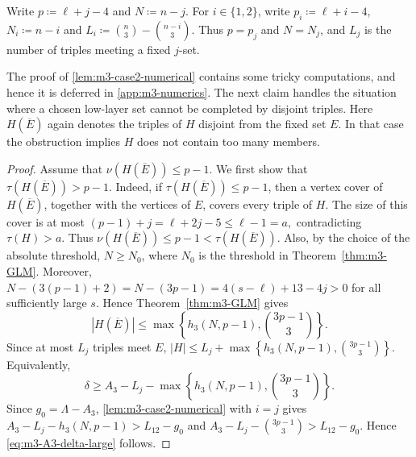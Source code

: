 \documentclass[10pt,a4paper]{article}
\numberwithin{equation}{section}
\newtheorem{lemma}[lemma]{Lemma}
\theoremstyle{definition}
\newtheorem{claim}[claim]{Claim}
\begin{document}
Write $p\coloneqq \ell+j-4$ and $N\coloneqq n-j$.
For \(i\in\{1,2\}\), write $p_i\coloneqq \ell+i-4$, $N_i\coloneqq n-i$ and $L_i\coloneqq \binom n3-\binom{n-i}{3}$.
Thus \(p=p_j\) and \(N=N_j\), and \(L_j\) is the number of triples meeting a fixed \(j\)-set.


The proof of \cref{lem:m3-case2-numerical} contains some tricky computations, and hence it is deferred in \cref{app:m3-numerics}.
The next claim handles the situation where a chosen low-layer set cannot be
completed by disjoint triples.  Here \(H(\overline E)\) again denotes the triples of \(H\) disjoint from the fixed set \(E\).
In that case the obstruction implies $H$ does not contain too many members.


\begin{proof}
    Assume that \(\nu(H(\overline E))\le p-1\).  We first show that
    \(\tau(H(\overline E))>p-1\).  Indeed, if
    \(\tau(H(\overline E))\le p-1\), then a vertex cover of
    \(H(\overline E)\), together with the vertices of \(E\), covers every
    triple of \(H\).  The size of this cover is at most
    \((p-1)+j = \ell+2j-5 \le \ell-1 = a,\)
    contradicting \(\tau(H)>a\).  Thus
    \(\nu(H(\overline E))\le p-1<\tau(H(\overline E)).\)
    Also, by the choice of the absolute threshold, \(N\ge N_0\), where
    \(N_0\) is the threshold in Theorem~\ref{thm:m3-GLM}.  Moreover,
    \(N-(3(p-1)+2) = N-(3p-1) = 4(s-\ell)+13-4j>0\)
    for all sufficiently large \(s\).  Hence Theorem~\ref{thm:m3-GLM} gives
    \[
        |H(\overline E)|
        \le
        \max\left\{
        h_3(N,p-1),\binom{3p-1}{3}
        \right\}.
    \]
    Since at most \(L_j\) triples meet \(E\), $|H|\le L_j+\max\left\{h_3(N,p-1),\binom{3p-1}{3}\right\}$.
    Equivalently,
    \[
        \delta
        \ge
        A_3-L_j-
        \max\left\{
        h_3(N,p-1),\binom{3p-1}{3}
        \right\}.
    \]
    Since \(g_0=\Lambda-A_3\), \cref{lem:m3-case2-numerical} with
    \(i=j\) gives
    \(A_3-L_j-h_3(N,p-1)>L_{12}-g_0\)
    and
    \(A_3-L_j-\binom{3p-1}{3}>L_{12}-g_0.\)
    Hence \eqref{eq:m3-A3-delta-large} follows.
\end{proof}
\end{document}
